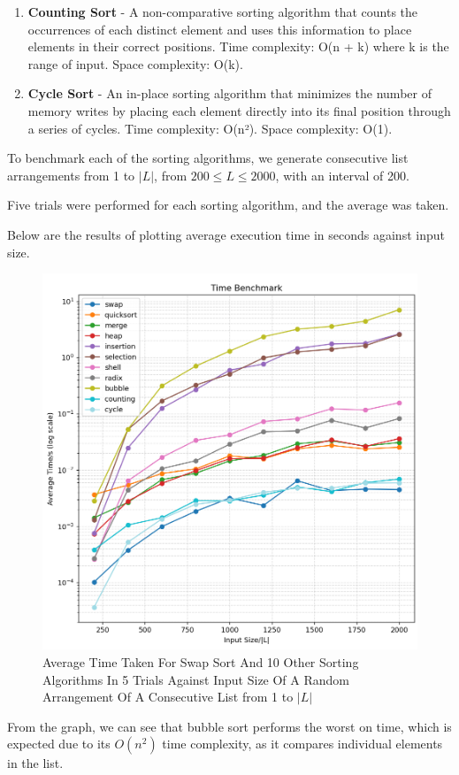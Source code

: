 \documentclass[12pt]{article}
\begin{document}
\begin{enumerate}[start=1]
    \item \textbf{Counting Sort} - A non-comparative sorting algorithm that counts the occurrences of each distinct element and uses this information to place elements in their correct positions. Time complexity: O(n + k) where k is the range of input. Space complexity: O(k).
    
    \item \textbf{Cycle Sort} - An in-place sorting algorithm that minimizes the number of memory writes by placing each element directly into its final position through a series of cycles. Time complexity: O(n²). Space complexity: O(1).
\end{enumerate}

To benchmark each of the sorting algorithms, we generate consecutive list arrangements from 1 to $|L|$, from $200 \leq L \leq 2000$, with an interval of 200.

Five trials were performed for each sorting algorithm, and the average was taken.

Below are the results of plotting average execution time in seconds against input size.

\begin{figure}[H]
    \centering
    \includegraphics[width=0.75\linewidth]{Time_Benchmark.png}
    \caption{Average Time Taken For Swap Sort And 10 Other Sorting Algorithms In 5 Trials Against Input Size Of A Random Arrangement Of A Consecutive List from 1 to $|L|$}
    \label{fig:placeholder}
\end{figure}

From the graph, we can see that bubble sort performs the worst on time, which is expected due to its $O(n^2)$ time complexity, as it compares individual elements in the list.
\end{document}

